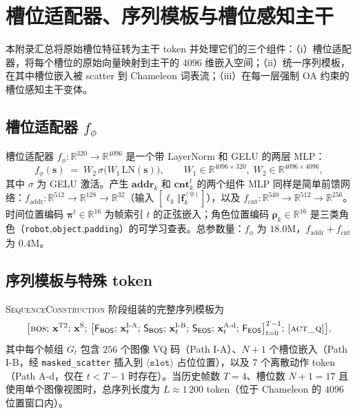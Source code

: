 \section{槽位适配器、序列模板与槽位感知主干}
\label{app:slot-adapter}
\label{app:oa-impl}

本附录汇总将原始槽位特征转为主干 token 并处理它们的三个组件：（i）槽位适配器，将每个槽位的原始向量映射到主干的 $4096$ 维嵌入空间；（ii）统一序列模板，在其中槽位嵌入被 scatter 到 Chameleon 词表流；（iii）在每一层强制 OA 约束的槽位感知主干变体。

\subsection*{槽位适配器 $f_\phi$}

槽位适配器 $f_\phi:\mathbb{R}^{320}\!\to\!\mathbb{R}^{4096}$ 是一个带 LayerNorm 和 GELU 的两层 MLP：
\[
f_\phi(\mathbf{s})\;=\;W_2\,\sigma\!\bigl(W_1\,\mathrm{LN}(\mathbf{s})\bigr),\qquad W_1\in\mathbb{R}^{4096\times 320},\;W_2\in\mathbb{R}^{4096\times 4096},
\]
其中 $\sigma$ 为 GELU 激活。产生 $\mathbf{addr}_k$ 和 $\mathbf{cnt}_k^t$ 的两个组件 MLP 同样是简单前馈网络：$f_\mathrm{addr}:\mathbb{R}^{512}\!\to\!\mathbb{R}^{128}\!\to\!\mathbb{R}^{32}$（输入 $[\boldsymbol{\ell}_k\Vert\mathbf{f}_k^{(0)}]$），以及 $f_\mathrm{cnt}:\mathbb{R}^{540}\!\to\!\mathbb{R}^{512}\!\to\!\mathbb{R}^{256}$。时间位置编码 $\boldsymbol{\pi}^t\in\mathbb{R}^{16}$ 为帧索引 $t$ 的正弦嵌入；角色位置编码 $\boldsymbol{\rho}_k\in\mathbb{R}^{16}$ 是三类角色（\texttt{robot},\texttt{object},\texttt{padding}）的可学习查表。总参数量：$f_\phi$ 为 $18.0$M，$f_\mathrm{addr}+f_\mathrm{cnt}$ 为 $0.4$M。

\subsection*{序列模板与特殊 token}
\label{app:sequence}

\textsc{SequenceConstruction} 阶段组装的完整序列模板为
\[
\bigl[\textsc{bos};\,\mathbf{x}^{\text{T2}};\,\mathbf{x}^{\text{S}};\,\bigl[\mathsf{F_{BOS}};\,\mathbf{x}_t^{\text{I-A}};\,\mathsf{S_{BOS}};\,\mathbf{x}_t^{\text{I-B}};\,\mathsf{S_{EOS}};\,\mathbf{x}_t^{\text{A-d}};\,\mathsf{F_{EOS}}\bigr]_{t=0}^{T-1};\,\textsc{[act\_q]}\bigr],
\]
其中每个帧组 $G_t$ 包含 $256$ 个图像 VQ 码（Path I-A）、$N{+}1$ 个槽位嵌入（Path I-B，经 \texttt{masked\_scatter} 插入到 $\langle\texttt{slot}\rangle$ 占位位置），以及 $7$ 个离散动作 token（Path A-d，仅在 $t<T{-}1$ 时存在）。当历史帧数 $T{=}4$、槽位数 $N{+}1{=}17$ 且使用单个图像视图时，总序列长度为 $L\!\approx\!1\,200$ token（位于 Chameleon 的 $4096$ 位置窗口内）。

